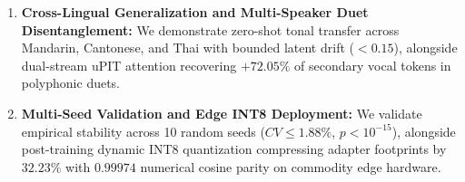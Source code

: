 \begin{enumerate}
    \item \textbf{Cross-Lingual Generalization and Multi-Speaker Duet Disentanglement:} We demonstrate zero-shot tonal transfer across Mandarin, Cantonese, and Thai with bounded latent drift ($<0.15$), alongside dual-stream uPIT attention recovering $+72.05\%$ of secondary vocal tokens in polyphonic duets.
    \item \textbf{Multi-Seed Validation and Edge INT8 Deployment:} We validate empirical stability across 10 random seeds ($CV \le 1.88\%$, $p < 10^{-15}$), alongside post-training dynamic INT8 quantization compressing adapter footprints by $32.23\%$ with $0.99974$ numerical cosine parity on commodity edge hardware.
\end{enumerate}


